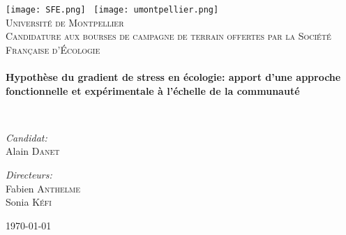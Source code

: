 \begin{titlepage}
\begin{center}

\texttt{[image: SFE.png]}~ \hfill \texttt{[image: umontpellier.png]}~\\[1cm]

\textsc{\LARGE Université de Montpellier}\\[1.5cm]

\textsc{\large Candidature aux bourses de campagne de terrain offertes par la 
Société Française d'Écologie}\\[0.5cm]

\HRule \\[0.4cm]
{ \Large \bfseries  Hypothèse du gradient de stress en écologie: apport d'une approche fonctionnelle et expérimentale à l'échelle de la communauté \\[0.4cm] }

\HRule \\[1.5cm]

\noindent
\begin{minipage}{0.4\textwidth}
\begin{flushleft} \large
\emph{Candidat:}\\
Alain \textsc{Danet}
\end{flushleft}
\end{minipage}%
\begin{minipage}{0.4\textwidth}
\begin{flushright} \large
\emph{Directeurs:} \\
Fabien \textsc{Anthelme} \\[0.0cm]
Sonia \textsc{Kéfi}
\end{flushright}
\end{minipage}

\vfill

{\large \today}

\end{center}
\end{titlepage}